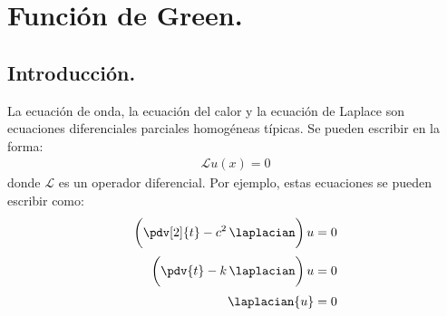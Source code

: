 \chapter{Función de Green.}
\section{Introducción.}

La ecuación de onda, la ecuación del calor y la ecuación de Laplace son ecuaciones diferenciales parciales homogéneas típicas. Se pueden escribir en la forma:
\begin{align*}
\mathcal{L} u (x) = 0
\end{align*}
donde $\mathcal{L}$ es un operador diferencial. Por ejemplo, estas ecuaciones se pueden escribir como:
\begin{align*}
\bigg( \pdv[2]{t} - c^{2} \, \laplacian \bigg) \, u &= 0 \\[0.25em]
\bigg( \pdv{t} - k \, \laplacian \bigg) \, u &= 0 \\[0.25em]
\laplacian{u} &= 0
\end{align*}

